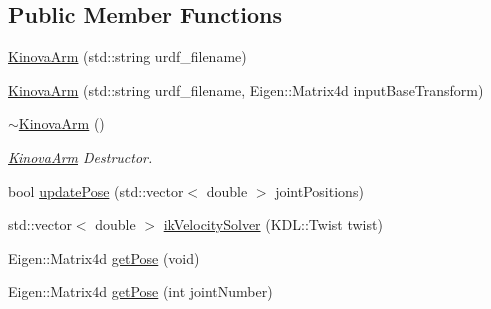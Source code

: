\subsection*{Public Member Functions}
\begin{DoxyCompactItemize}
\item 
\hyperlink{class_kinova_arm_abbbe90c0d43bf6665d62bdf6c1ef398f}{Kinova\+Arm} (std\+::string urdf\+\_\+filename)
\item 
\hyperlink{class_kinova_arm_a5ca50dcf1c211aea4986bc5a04f37331}{Kinova\+Arm} (std\+::string urdf\+\_\+filename, Eigen\+::\+Matrix4d input\+Base\+Transform)
\item 
\hyperlink{class_kinova_arm_a9d5b485d8137a0b27e98a0c1c4d67861}{$\sim$\+Kinova\+Arm} ()\hypertarget{class_kinova_arm_a9d5b485d8137a0b27e98a0c1c4d67861}{}\label{class_kinova_arm_a9d5b485d8137a0b27e98a0c1c4d67861}

\begin{DoxyCompactList}\small\item\em \hyperlink{class_kinova_arm}{Kinova\+Arm} Destructor. \end{DoxyCompactList}\item 
bool \hyperlink{class_kinova_arm_a3374988c7b3d9ae8773bc63f950629f7}{update\+Pose} (std\+::vector$<$ double $>$ joint\+Positions)
\item 
std\+::vector$<$ double $>$ \hyperlink{class_kinova_arm_a0a5a3bd128b420d58d92d242c075db92}{ik\+Velocity\+Solver} (K\+D\+L\+::\+Twist twist)
\item 
Eigen\+::\+Matrix4d \hyperlink{class_kinova_arm_aea7c01f72eb70387ff71ca130db3bd3f}{get\+Pose} (void)
\item 
Eigen\+::\+Matrix4d \hyperlink{class_kinova_arm_a66f0535b3c926b692e05a97f82efd3b2}{get\+Pose} (int joint\+Number)
\end{DoxyCompactItemize}
